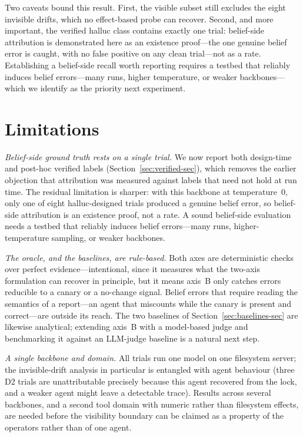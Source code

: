 \documentclass[runningheads]{llncs}
\begin{document}
Two caveats bound this result. First, the visible subset still excludes the eight invisible drifts, which no effect-based probe can recover. Second, and more important, the verified \textsf{halluc} class contains exactly one trial: belief-side attribution is demonstrated here as an existence proof---the one genuine belief error is caught, with no false positive on any clean trial---not as a rate. Establishing a belief-side recall worth reporting requires a testbed that reliably induces belief errors---many runs, higher temperature, or weaker backbones---which we identify as the priority next experiment.

\section{Limitations}
\label{sec:limits}

\smallskip\noindent\emph{Belief-side ground truth rests on a single trial.} We now report both design-time and post-hoc verified labels (Section~\ref{sec:verified-sec}), which removes the earlier objection that attribution was measured against labels that need not hold at run time. The residual limitation is sharper: with this backbone at temperature~0, only one of eight \textsf{halluc}-designed trials produced a genuine belief error, so belief-side attribution is an existence proof, not a rate. A sound belief-side evaluation needs a testbed that reliably induces belief errors---many runs, higher-temperature sampling, or weaker backbones.

\smallskip\noindent\emph{The oracle, and the baselines, are rule-based.} Both axes are deterministic checks over perfect evidence---intentional, since it measures what the two-axis formulation can recover in principle, but it means axis~B only catches errors reducible to a canary or a no-change signal. Belief errors that require reading the semantics of a report---an agent that miscounts while the canary is present and correct---are outside its reach. The two baselines of Section~\ref{sec:baselines-sec} are likewise analytical; extending axis~B with a model-based judge and benchmarking it against an LLM-judge baseline is a natural next step.

\smallskip\noindent\emph{A single backbone and domain.} All trials run one model on one filesystem server; the invisible-drift analysis in particular is entangled with agent behaviour (three D2 trials are unattributable precisely because this agent recovered from the lock, and a weaker agent might leave a detectable trace). Results across several backbones, and a second tool domain with numeric rather than filesystem effects, are needed before the visibility boundary can be claimed as a property of the operators rather than of one agent.
\end{document}
